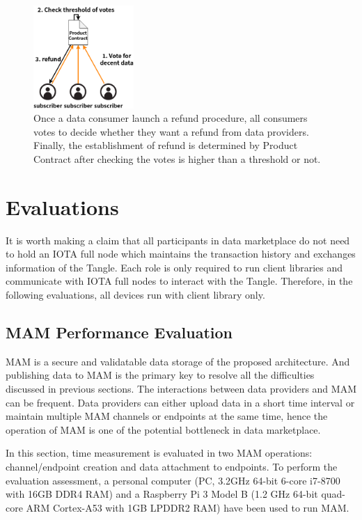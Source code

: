 \documentclass[conference]{IEEEtran}
\begin{document}
\begin{figure}[h]
    \centering
    \includegraphics[width=1.5in]{refund}
    \caption{Once a data consumer launch a refund procedure, all consumers votes to decide whether they want a refund from data providers. Finally, the establishment of refund is determined by Product Contract after checking the votes is higher than a threshold or not.}
    \label{fig:refund}
\end{figure}


\section{Evaluations}
\label{section:evaluation}
It is worth making a claim that all participants in data marketplace do not need to hold an IOTA full node which maintains the transaction history and exchanges information of the Tangle. Each role is only required to run client libraries and communicate with IOTA full nodes to interact with the Tangle. Therefore, in the following evaluations, all devices run with client library only.

\subsection{MAM Performance Evaluation}
\label{section:mam_performance}
MAM is a secure and validatable data storage of the proposed architecture. And publishing data to MAM is the primary key to resolve all the difficulties discussed in previous sections. The interactions between data providers and MAM can be frequent. Data providers can either upload data in a short time interval or maintain multiple MAM channels or endpoints at the same time, hence the operation of MAM is one of the potential bottleneck in data marketplace.

In this section, time measurement is evaluated in two MAM operations: channel/endpoint creation and data attachment to endpoints. To perform the evaluation assessment, a personal computer (PC, 3.2GHz 64-bit 6-core i7-8700 with 16GB DDR4 RAM) and a Raspberry Pi 3 Model B (1.2 GHz 64-bit quad-core ARM Cortex-A53 with 1GB LPDDR2 RAM) have been used to run MAM. 
\end{document}

